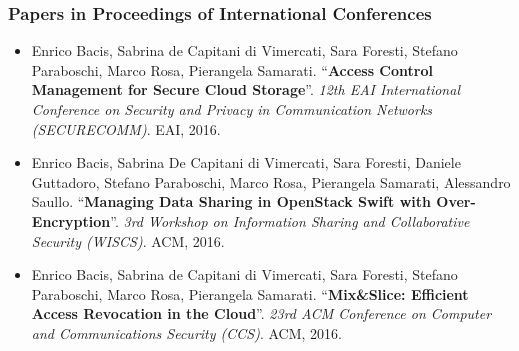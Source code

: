 {\subsubsection*{Papers in Proceedings of International Conferences}
\begin{itemize}	
	
	\item Enrico Bacis, Sabrina de Capitani di Vimercati, Sara Foresti, Stefano Paraboschi, Marco Rosa, Pierangela Samarati. ``\textbf{Access Control Management for Secure Cloud Storage}''. {\em 12th EAI International Conference on Security and Privacy in Communication Networks (SECURECOMM)}. EAI, 2016.
	
	\item Enrico Bacis, Sabrina De Capitani di Vimercati, Sara Foresti, Daniele Guttadoro, Stefano Paraboschi, Marco Rosa, Pierangela Samarati, Alessandro Saullo. ``\textbf{Managing Data Sharing in OpenStack Swift with Over-Encryption}''. {\em 3rd Workshop on Information Sharing and Collaborative Security (WISCS)}. ACM, 2016.
	
	\item Enrico Bacis, Sabrina de Capitani di Vimercati, Sara Foresti, Stefano Paraboschi, Marco Rosa, Pierangela Samarati. ``\textbf{Mix\&Slice: Efficient Access Revocation in the Cloud}''. {\em 23rd ACM Conference on Computer and Communications Security (CCS)}. ACM, 2016.
	
	
	
	

\end{itemize}}
